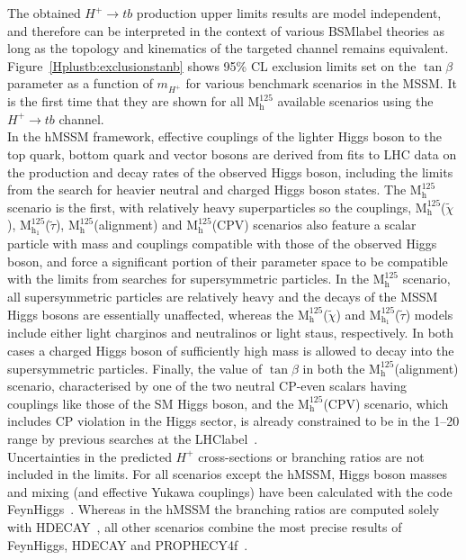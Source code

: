 The obtained $H^+\to tb$ production upper limits results are model independent, and therefore can be interpreted in the context of various \acrshort{BSMlabel} theories as long as the topology and kinematics of the targeted channel remains equivalent. Figure~\ref{Hplustb:exclusionstanb} shows 95\% CL exclusion limits set on the $\tan\beta$ parameter as a function of $m_{H^+}$ for various benchmark scenarios in the MSSM. It is the first time that they are shown for all $\text{M}^{125}_\text{h}$ available scenarios using the $H^+\to tb$ channel.\\

In the hMSSM framework, effective couplings of the lighter Higgs boson to the top quark, bottom quark and vector bosons are derived from fits to LHC data on the production and decay rates of the observed Higgs boson, including the limits from the search for heavier neutral and charged Higgs boson states. The $\text{M}^{125}_\text{h}$ scenario is the first, with relatively heavy superparticles so the couplings, $\text{M}^{125}_\text{h}$($\tilde{\chi}$), $\text{M}^{125}_{\text{h}_1}$($\tilde{\tau}$), $\text{M}^{125}_\text{h}$(alignment) and $\text{M}^{125}_\text{h}$(CPV) scenarios also feature a scalar particle with mass and couplings compatible with those of the observed Higgs boson, and force a significant portion of their parameter space to be compatible with the limits from searches for supersymmetric particles. In the $\text{M}^{125}_\text{h}$ scenario, all supersymmetric particles are relatively heavy and the decays of the MSSM Higgs bosons are essentially unaffected, whereas the $\text{M}^{125}_\text{h}$($\tilde{\chi}$) and $\text{M}^{125}_{\text{h}_1}$($\tilde{\tau}$) models include either light charginos and neutralinos or light staus, respectively. In both cases a charged Higgs boson of sufficiently high mass is allowed to decay into the supersymmetric particles. Finally, the value of $\tan\beta$ in both the $\text{M}^{125}_\text{h}$(alignment) scenario, characterised by one of the two neutral CP-even scalars having couplings like those of the SM Higgs boson, and the $\text{M}^{125}_\text{h}$(CPV) scenario, which includes CP violation in the Higgs sector, is already constrained to be in the 1--20 range by previous searches at the \acrshort{LHClabel}~\cite{PhysRevD.91.075015}.\\

Uncertainties in the predicted $H^+$ cross-sections or branching ratios are not included in the limits. For all scenarios except the hMSSM, Higgs boson masses and mixing (and effective Yukawa couplings) have been calculated with the code FeynHiggs~\cite{Heinemeyer_2000,Heinemeyer_1999,Degrassi_2003,Hahn_2014,Frank_2007,Bahl_2016,Bahl_2018}. Whereas in the hMSSM the branching ratios are computed solely with HDECAY~\cite{Djouadi_2019,Djouadi_1998}, all other scenarios combine the most precise results of FeynHiggs, HDECAY and PROPHECY4f~\cite{Bredenstein_2006,Bredenstein_2007}.\\

